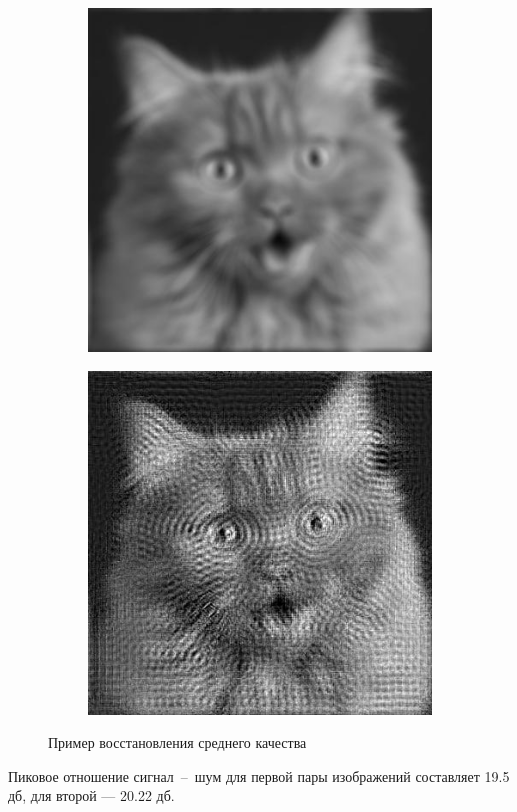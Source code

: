 \begin{figure}[!h]
	\centering
	\begin{subfigure}{.5\textwidth}
		\centering
		\includegraphics[scale=0.5]{assets/cat_norm}
	\end{subfigure}%
	\begin{subfigure}{.5\textwidth}
		\centering
		\includegraphics[scale=0.66]{assets/cat_norm_result}
	\end{subfigure}
	\caption{Пример восстановления среднего качества}
	\label{expr6}
\end{figure}

Пиковое отношение сигнал~--~шум для первой пары изображений составляет 19.5 дб, для второй --- 20.22 дб.

